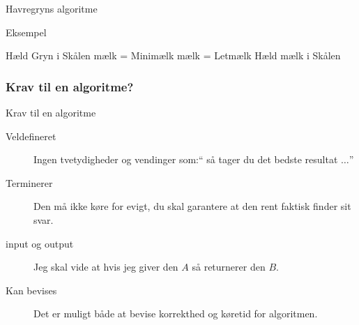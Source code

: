 \documentclass[12pt,t]{beamer}
\begin{document}
    \begin{frame}[plain]{Havregryns algoritme}
        \begin{block}{Eksempel}
        \vspace{-1.5em}
        \begin{algorithm}[H]
            \caption{\newline Indgangsbetingelser: En skål, mælk, havregryn
                     \newline Udgangsbetingelser: Morgenmad
            }
            \begin{algorithmic}
                    \State Hæld Gryn i Skålen
                \EndWhile
                    \State mælk = Minimælk
                \Else
                    \State mælk = Letmælk
                \EndIf
                    \State Hæld mælk i Skålen
                \EndWhile
            \end{algorithmic}
        \end{algorithm}
        \end{block}
    \end{frame}

    \begin{frame}
        \frametitle{Krav til en algoritme?}
        \begin{block}{Krav til en algoritme}
        \begin{description}
            \item[Veldefineret] Ingen tvetydigheder og vendinger som:``
            så tager du det bedste resultat $\dots$'' \pause
            \item[Terminerer] Den må ikke køre for evigt, du skal garantere
            at den rent faktisk finder sit svar. \pause
            \item[input og output] Jeg skal vide at hvis jeg giver
            den $A$ så returnerer den $B$. \pause
            \item[Kan bevises] Det er muligt både at bevise korrekthed og
            køretid for algoritmen.
        \end{description}
        \end{block}
    \end{frame}
\end{document}
